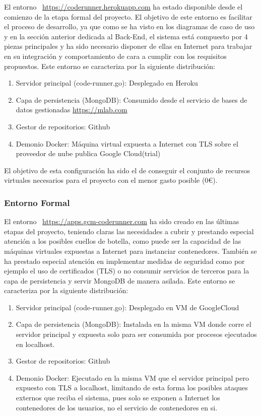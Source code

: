 \documentclass[a4paper,11pt]{book}
\begin{document}
El entorno  ~\url{https://coderunner.herokuapp.com} ha estado disponible desde el comienzo de la etapa formal del proyecto. El objetivo de este entorno es facilitar el proceso de desarrollo, ya que  como se ha visto en los diagramas de caso de uso y en la sección anterior dedicada al Back-End, el sistema está compuesto por 4 piezas principales y ha sido necesario disponer de ellas en Internet para trabajar en su integración y comportamiento de cara a cumplir con los requisitos propuestos. Este entorno se caracteriza por la siguiente distribución: 


\begin{enumerate}
\item Servidor principal (code-runner.go): Desplegado en Heroku~\cite{hero}
\item Capa de persistencia (MongoDB): Consumido desde el servicio de bases de datos gestionadas \url{https://mlab.com}
\item Gestor de repositorios: Github~\cite{github}
\item Demonio Docker: Máquina virtual expuesta a Internet con TLS sobre el proveedor de nube publica Google Cloud(trial)~\cite{gcp}
\end{enumerate}

El objetivo de esta configuración ha sido el de conseguir el conjunto de recursos virtuales necesarios para el proyecto con el menor gasto posible (0€).

\subsubsection{Entorno Formal}

El entorno  ~\url{https://apps.gcm-coderunner.com} ha sido creado en las últimas etapas del proyecto, teniendo claras las necesidades a cubrir y prestando especial atención a los posibles cuellos de botella, como puede ser la capacidad de las máquinas virtuales expuestas a Internet para instanciar contenedores.  También se ha prestado especial atención en implementar medidas de seguridad como por ejemplo el uso de certificados (TLS) o no consumir servicios de terceros para la capa de persistencia y servir MongoDB de manera asilada. Este entorno se caracteriza por la siguiente distribución: 

\begin{enumerate}
\item Servidor principal (code-runner.go): Desplegado en VM de GoogleCloud~\cite{gcp}
\item Capa de persistencia (MongoDB): Instalada en la misma VM donde corre el servidor principal y expuesta solo para ser consumida por procesos ejecutados en localhost. 
\item Gestor de repositorios: Github~\cite{github}
\item Demonio Docker: Ejecutado en la misma VM que el servidor principal  pero expuesto con TLS a localhost, limitando de esta forma los posibles ataques externos que reciba el sistema, pues solo se exponen a Internet los contenedores de los usuarios, no el servicio de contenedores en si. 
\end{enumerate}
\end{document}
